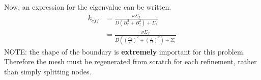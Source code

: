 \documentclass{article}
\begin{document}
  Now, an expression for the eigenvalue can be written.
  \begin{align}
    k_{eff} &= \frac{\nu \Sigma_f}{D(B_r^2 + B_z^2) + \Sigma_r} \\
    &= \frac{\nu \Sigma_f}{D\left(\left(\frac{\alpha_0}{R}\right)^2 + 
      \left(\frac{\pi}{H}\right)^2 \right) + \Sigma_r}
  \end{align}
  NOTE: the shape of the boundary is \textbf{extremely} important for this 
  problem. Therefore
  the mesh must be regenerated from scratch for each 
  refinement, rather than simply splitting nodes.
  
  
  
  
\end{document}
